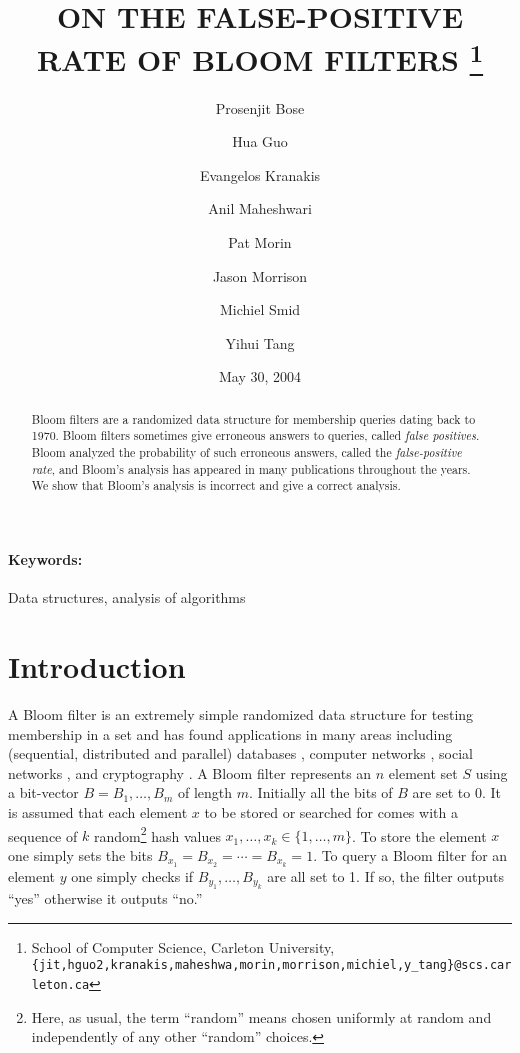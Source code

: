 \documentclass[lotsofwhite]{patmorin}
\title{\MakeUppercase{On the False-Positive Rate of Bloom Filters}%
	\thanks{School of Computer Science,
		Carleton University,
		\texttt{\{jit,hguo2,kranakis,maheshwa,morin,morrison,michiel,y\_tang\}@scs.carleton.ca}}}
\author{Prosenjit Bose 
	\and Hua Guo 
	\and Evangelos Kranakis 
	\and Anil Maheshwari 
	\and Pat Morin
	\and Jason Morrison
	\and Michiel Smid 
	\and Yihui Tang
}
\date{May 30, 2004}
\begin{document}
\maketitle

\begin{abstract}
Bloom filters are a randomized data structure for membership queries
dating back to 1970.  Bloom filters sometimes give erroneous answers
to queries, called \emph{false positives}.  Bloom analyzed the probability of
such erroneous answers, called the \emph{false-positive rate}, and
Bloom's analysis has appeared in many publications throughout the
years.  We show that Bloom's analysis is incorrect and give a correct
analysis.
\end{abstract}

\paragraph{Keywords:} Data structures, analysis of algorithms

\section{Introduction}

A Bloom filter \cite{b70} is an extremely simple randomized data
structure for testing membership in a set and has found applications
in many areas including (sequential, distributed and parallel)
databases \cite{g82,m83,r82}, computer networks \cite{bm02}, social
networks \cite{loaf}, and cryptography \cite{bc04,g03}. A Bloom filter
represents an $n$ element set $S$ using a bit-vector
$B=B_1,\ldots,B_{m}$ of length $m$.  Initially all the bits of $B$
are set to 0.  It is assumed that each element $x$ to be stored or
searched for comes with a sequence of $k$ random\footnote{Here, as
usual, the term ``random'' means chosen uniformly at random and
independently of any other ``random'' choices.} hash values
$x_1,\ldots,x_k\in \{1,\ldots,m\}$.  To store the element $x$ one
simply sets the bits $B_{x_1}=B_{x_2}=\cdots=B_{x_k}=1$.  To query a
Bloom filter for an element $y$ one simply checks if
$B_{y_1},\ldots,B_{y_k}$ are all set to 1.  If so, the filter outputs
``yes'' otherwise it outputs ``no.''
\end{document}
